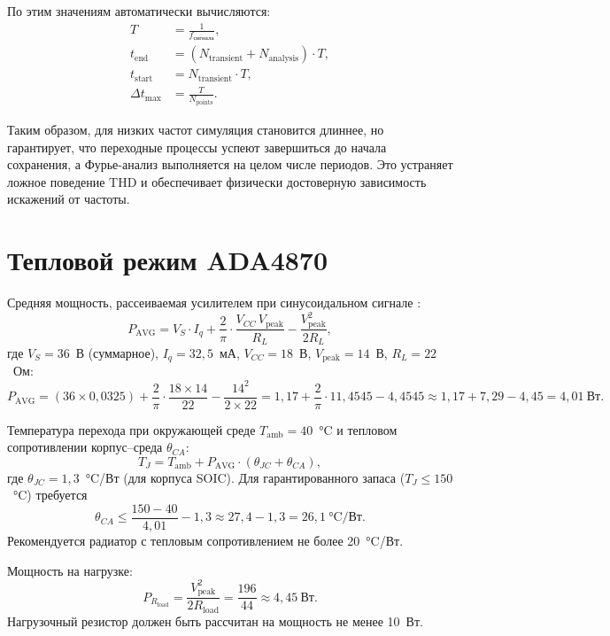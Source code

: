 \documentclass[a4paper, 12pt]{article}
\begin{document}
По этим значениям автоматически вычисляются:
\begin{align}
    T &= \frac{1}{f_{\text{сигнала}}},\\
    t_{\text{end}} &= (N_{\text{transient}} + N_{\text{analysis}}) \cdot T,\\
    t_{\text{start}} &= N_{\text{transient}} \cdot T,\\
    \Delta t_{\text{max}} &= \frac{T}{N_{\text{points}}}.
\end{align}

Таким образом, для низких частот симуляция становится длиннее, но гарантирует, что переходные процессы успеют завершиться до начала сохранения, а Фурье-анализ выполняется на целом числе периодов. Это устраняет ложное поведение THD и обеспечивает физически достоверную зависимость искажений от частоты.

\section{Тепловой режим ADA4870}

Средняя мощность, рассеиваемая усилителем при синусоидальном
сигнале \cite{ADA4870_ds}:
\begin{equation}
  P_{\text{AVG}} = V_S \cdot I_q
    + \frac{2}{\pi}\cdot\frac{V_{CC}\,V_{\text{peak}}}{R_L}
    - \frac{V_{\text{peak}}^2}{2R_L},
  \label{eq:power}
\end{equation}
где \(V_S = 36\)~В (суммарное), \(I_q = 32{,}5\)~мА,
\(V_{CC} = 18\)~В, \(V_{\text{peak}} = 14\)~В, \(R_L = 22\)~Ом:
\[
    P_{\text{AVG}} = (36 \times 0{,}0325)
    + \frac{2}{\pi}\cdot\frac{18 \times 14}{22}
    - \frac{14^2}{2 \times 22}
    = 1{,}17 + \frac{2}{\pi}\cdot 11{,}4545 - 4{,}4545
    \approx 1{,}17 + 7{,}29 - 4{,}45 = 4{,}01\ \text{Вт}.
\]

Температура перехода при окружающей среде \(T_{\text{amb}} = 40\)~°C
и тепловом сопротивлении корпус–среда \(\theta_{CA}\):
\[
    T_J = T_{\text{amb}} + P_{\text{AVG}} \cdot (\theta_{JC} + \theta_{CA}),
\]
где \(\theta_{JC} = 1{,}3\)~°C/Вт (для корпуса SOIC).
Для гарантированного запаса (\(T_J \le 150\)~°C) требуется
\[
    \theta_{CA} \le \frac{150 - 40}{4{,}01} - 1{,}3 \approx 27{,}4 - 1{,}3 = 26{,}1\ \text{°C/Вт}.
\]
Рекомендуется радиатор с тепловым сопротивлением не более 20~°C/Вт.

Мощность на нагрузке:
\[
    P_{R_{\text{load}}} = \frac{V_{\text{peak}}^2}{2R_{\text{load}}}
    = \frac{196}{44} \approx 4{,}45\ \text{Вт}.
\]
Нагрузочный резистор должен быть рассчитан на мощность не менее 10~Вт.
\end{document}
